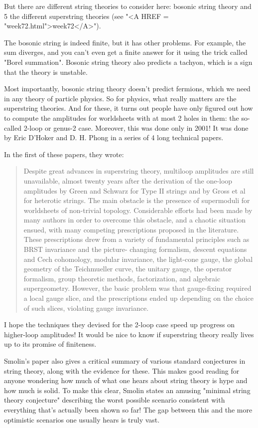 But there are different string theories to consider here: bosonic 
string theory and 5 the different superstring theories (see "<A HREF = "week72.html">week72</A>").  


The bosonic string is indeed finite, but it has other
problems.  For example, the sum diverges, and you can't even get a
finite answer for it using the trick called "Borel
summation".  Bosonic string theory also predicts a tachyon, which
is a sign that the theory is unstable.

Most importantly, bosonic string theory doesn't predict fermions, which 
we need in any theory of particle physics.  So for physics, what really 
matters are the superstring theories.  And for these, it turns out people 
have only figured out how to compute the amplitudes for worldsheets with 
at most 2 holes in them: the so-called 2-loop or genus-2 case.  Moreover, 
this was done only in 2001!   It was done by Eric D'Hoker and D. H. Phong
in a series of 4 long technical papers.

In the first of these papers, they wrote:

\begin{quote}
 Despite great advances in superstring theory, multiloop 
 amplitudes are still unavailable, almost twenty years after the
 derivation of the one-loop amplitudes by Green and Schwarz
 for Type II strings and by Gross et al for heterotic strings.  
 The main obstacle is the presence of supermoduli for worldsheets
 of non-trivial topology.  Considerable efforts had been made by
 many authors in order to overcome this obstacle, and a chaotic
 situation ensued, with many competing prescriptions proposed in 
 the literature.  These prescriptions drew from a variety of 
 fundamental principles such as BRST invariance and the picture-
 changing formalism, descent equations and Cech cohomology, 
 modular invariance, the light-cone gauge, the global geometry
 of the Teichmueller curve, the unitary gauge, the operator
 formalism, group theoretic methods, factorization, and algebraic
 supergeometry.  However, the basic problem was that gauge-fixing
 required a local gauge slice, and the prescriptions ended up 
 depending on the choice of such slices, violating gauge invariance.
\end{quote}
I hope the techniques they devised for the 2-loop case speed up 
progress on higher-loop amplitudes!  It would be nice to know if 
superstring theory really lives up to its promise of finiteness.


Smolin's paper also gives a critical summary of various standard
conjectures in string theory, along with the evidence for these.  This
makes good reading for anyone wondering how much of what one hears
about string theory is hype and how much is solid.  To make this
clear, Smolin states an amusing "minimal string theory
conjecture" describing the worst possible scenario consistent
with everything that's actually been shown so far!  The gap between
this and the more optimistic scenarios one usually hears is truly
vast.

